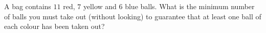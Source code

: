 A bag contains $11$ red, $7$ yellow and $6$ blue balls. What is the minimum number of balls you must take out (without looking) to guarantee that at least one ball of each colour has been taken out?
